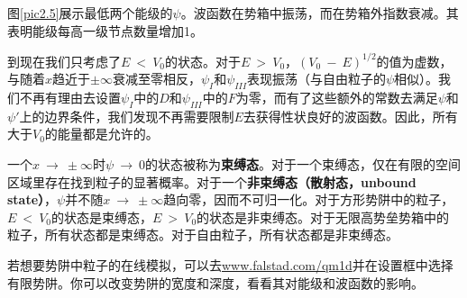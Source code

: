 \documentclass[12pt,a4paper,openany]{ctexbook}
\begin{document}
\begin{flushleft}
图\ref{pic2.5}展示最低两个能级的$\psi$。波函数在势箱中振荡，而在势箱外指数衰减。其表明能级每高一级节点数量增加1。

到现在我们只考虑了$E\ <\ V_0$的状态。对于$E\ >\ V_0$，$(V_0\ -\ E)^{1/2}$的值为虚数，与随着$x$趋近于$\pm\infty$衰减至零相反，$\psi_I$和$\psi_{III}$表现振荡（与自由粒子的$\psi$相似）。我们不再有理由去设置$\psi_I$中的$D$和$\psi_{III}$中的$F$为零，而有了这些额外的常数去满足$\psi$和$\psi'$上的边界条件，我们发现不再需要限制$E$去获得性状良好的波函数。因此，所有大于$V_0$的能量都是允许的。

一个$x\ \to\ \pm\infty$时$\psi\ \to\ 0$的状态被称为\textbf{束缚态}。对于一个束缚态，仅在有限的空间区域里存在找到粒子的显著概率。对于一个\textbf{非束缚态（散射态，unbound state）}，$\psi$并不随$x\ \to\ \pm\infty$趋向零，因而不可归一化。对于方形势阱中的粒子，$E\ <\ V_0$的状态是束缚态，$E\ >\ V_0$的状态是非束缚态。对于无限高势垒势箱中的粒子，所有状态都是束缚态。对于自由粒子，所有状态都是非束缚态。

若想要势阱中粒子的在线模拟，可以去\url{www.falstad.com/qm1d}并在设置框中选择有限势阱。你可以改变势阱的宽度和深度，看看其对能级和波函数的影响。
\end{flushleft}
\end{document}
